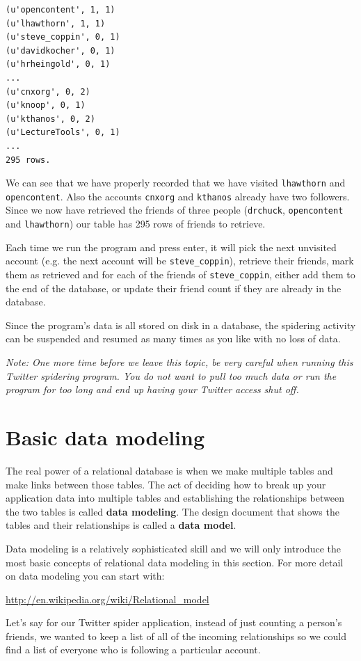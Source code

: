\documentclass[10pt]{book}
\begin{document}
\beforeverb
\begin{verbatim}
(u'opencontent', 1, 1)
(u'lhawthorn', 1, 1)
(u'steve_coppin', 0, 1)
(u'davidkocher', 0, 1)
(u'hrheingold', 0, 1)
...
(u'cnxorg', 0, 2)
(u'knoop', 0, 1)
(u'kthanos', 0, 2)
(u'LectureTools', 0, 1)
...
295 rows.
\end{verbatim}
\afterverb
%
We can see that we have properly recorded that we have visited 
{\tt lhawthorn} and {\tt opencontent}.  Also the accounts 
{\tt cnxorg} and {\tt kthanos} already have two followers.
Since we now have retrieved the friends of three people
({\tt drchuck}, {\tt opencontent} and {\tt lhawthorn}) our table has 295 rows 
of friends to retrieve.

Each time we run the program and press enter, it will pick the next 
unvisited account (e.g. the next account will be \verb"steve_coppin"),
retrieve their friends, mark them as retrieved and for each of the 
friends of \verb"steve_coppin", either add them to the end of the 
database, or update their friend count if they are already in the
database.

Since the program's data is all stored on disk in a database, 
the spidering activity can be suspended and resumed as many times as you 
like with no loss of data.

\emph{Note: One more time before we leave this topic, 
be very careful when running this Twitter spidering program.  
You do not want to pull too much data or run the program for 
too long and end up having your Twitter access shut off.}

\section{Basic data modeling}

The real power of a relational database is when we make multiple tables
and make links between those tables.   The act of deciding how to break
up your application data into multiple tables and establishing the
relationships between the two tables is called {\bf data modeling}.  The
design document that shows the tables and their relationships 
is called a {\bf data model}.

Data modeling is a relatively sophisticated skill and we will only introduce
the most basic concepts of relational data modeling in this section.  For more
detail on data modeling you can start with:

\url{http://en.wikipedia.org/wiki/Relational_model}

Let's say for our Twitter spider application, instead of just 
counting a person's friends, we wanted to keep a list of 
all of the incoming relationships so we could find a list of 
everyone who is following a particular account.
\end{document}

